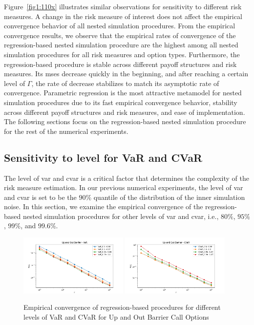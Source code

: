 Figure~\ref{fig1:110x} illustrates similar observations for sensitivity to different risk measures.
A change in the risk measure of interest does not affect the empirical convergence behavior of all nested simulation procedures.
From the empirical convergence results, we observe that the empirical rates of convergence of the regression-based nested simulation procedure are the highest among all nested simulation procedures for all risk measures and option types.
Furthermore, the regression-based procedure is stable across different payoff structures and risk measures. 
Its \gls{mse}s decrease quickly in the beginning, and after reaching a certain level of $\Gamma$, the rate of decrease stabilizes to match its asymptotic rate of convergence.
Parametric regression is the most attractive metamodel for nested simulation procedures due to its fast empirical convergence behavior, stability across different payoff structures and risk measures, and ease of implementation.
The following sections focus on the regression-based nested simulation procedure for the rest of the numerical experiments.

\subsection{Sensitivity to level for VaR and CVaR}\label{sec1:sensitivity-level}

The level of \gls{var} and \gls{cvar} is a critical factor that determines the complexity of the risk measure estimation.
In our previous numerical experiments, the level of \gls{var} and \gls{cvar} is set to be the $90\%$ quantile of the distribution of the inner simulation noise.
In this section, we examine the empirical convergence of the regression-based nested simulation procedures for other levels of \gls{var} and \gls{cvar}, i.e., $80\%$, $95\%$, $99\%$, and $99.6\%$.

\begin{figure}[ht!] 
    \centering
    \includegraphics[width=0.48\textwidth]{./project1/figures/figure9a.png}
    \includegraphics[width=0.48\textwidth]{./project1/figures/figure9b.png}
    \caption{Empirical convergence of regression-based procedures for different levels of VaR and CVaR for Up and Out Barrier Call Options}
\label{fig1:sens_level}
\end{figure}

